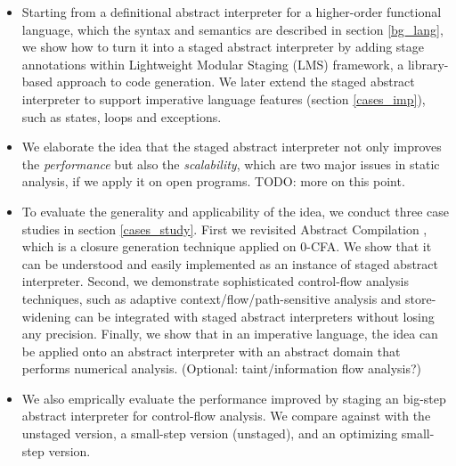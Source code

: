 \begin{itemize}
\item Starting from a definitional abstract interpreter for a higher-order functional language,
  which the syntax and semantics are described in section \ref{bg_lang},
  we show how to turn it into a staged abstract interpreter by adding stage annotations within
  Lightweight Modular Staging (LMS) framework, a library-based approach to code generation. 
  We later extend the staged abstract interpreter to support imperative language features 
  (section \ref{cases_imp}), such as states, loops and exceptions.
\item We elaborate the idea that the staged abstract interpreter not only improves the \textit{performance}
  but also the \textit{scalability}, which are two major issues in static analysis, if we apply it on open
  programs. TODO: more on this point.
\item To evaluate the generality and applicability of the idea, we conduct three case studies in section \ref{cases_study}. 
  First we revisited Abstract Compilation \cite{Boucher:1996:ACN:647473.727587}, which is a closure generation 
  technique applied on 0-CFA. We show that it can be understood and easily implemented as an instance of 
  staged abstract interpreter. 
  Second, we demonstrate sophisticated control-flow analysis techniques, such as adaptive context/flow/path-sensitive 
  analysis and store-widening can be integrated with staged abstract interpreters without losing any precision.
  Finally, we show that in an imperative language, the idea can be applied onto an abstract interpreter with
  an abstract domain that performs numerical analysis.
  (Optional: taint/information flow analysis?)
\item We also emprically evaluate the performance improved by staging an big-step abstract interpreter 
  for control-flow analysis. We compare against with the unstaged version, a small-step version (unstaged), 
  and an optimizing small-step version.
\end{itemize}
